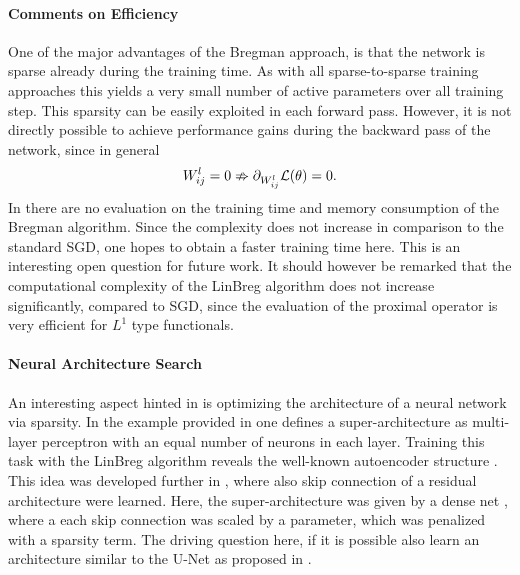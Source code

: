 \paragraph{Comments on Efficiency} One of the major advantages of the Bregman approach, is that the network is sparse already during the training time. As with all sparse-to-sparse training approaches this yields a very small number of active parameters over all training step. This sparsity can be easily exploited in each forward pass. However, it is not directly possible to achieve performance gains during the backward pass of the network, since in general
%
\begin{align*}
W^l_{ij} = 0 \nRightarrow \partial_{W^l_{ij}} \mathcal{L}(\theta) = 0.
\end{align*}
%
In \cite{bungert2022bregman, bungert2021neural} there are no evaluation on the training time and memory consumption of the Bregman algorithm. Since the complexity does not increase in comparison to the standard SGD, one hopes to obtain a faster training time here. This is an interesting open question for future work. It should however be remarked that the computational complexity of the LinBreg algorithm does not increase significantly, compared to SGD, since the evaluation of the proximal operator is very efficient for $L^1$ type functionals.

\paragraph{Neural Architecture Search} An interesting aspect hinted in \cite{bungert2022bregman} is optimizing the architecture of a neural network via sparsity. In the example provided in \cite[Fig. 4]{bungert2022bregman} one defines a super-architecture as multi-layer perceptron with an equal number of neurons in each layer. Training this task with the LinBreg algorithm reveals the well-known autoencoder structure \cite{hinton1993autoencoders}. This idea was developed further in \cite{bungert2021neural}, where also skip connection of a residual architecture were learned. Here, the super-architecture was given by a dense net \cite{huang2017densely}, where a each skip connection was scaled by a parameter, which was penalized with a sparsity term. The driving question here, if it is possible also learn an architecture similar to the U-Net as proposed in \cite{ronneberger2015u}.
%
%
%
%
\clearpage%
%
